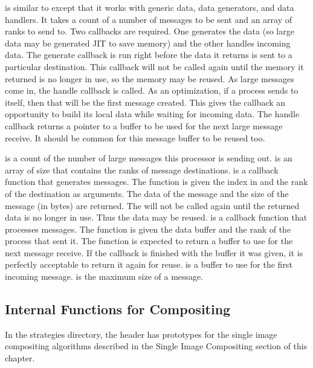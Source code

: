  is similar to
 except that it works with generic
data, data generators, and data handlers.  It takes a count of a number of
messages to be sent and an array of ranks to send to.  Two callbacks are
required.  One generates the data (so large data may be generated JIT to
save memory) and the other handles incoming data.  The generate callback is
run right before the data it returns is sent to a particular destination.
This callback will not be called again until the memory it returned is no
longer in use, so the memory may be reused.  As large messages come in, the
handle callback is called.  As an optimization, if a process sends to
itself, then that will be the first message created.  This gives the
callback an opportunity to build its local data while waiting for incoming
data.  The handle callback returns a pointer to a buffer to be used for the
next large message receive.  It should be common for this message buffer to
be reused too.

 is a count of the number of large messages this
processor is sending out.   is an array of size
 that contains the ranks of message destinations.
 is a callback function that generates messages.
The function is given the index in  and the rank
of the destination as arguments.  The data of the message and the size of
the message (in bytes) are returned.  The  will not
be called again until the returned data is no longer in use.  Thus the data
may be reused.   is a callback function that processes
messages.  The function is given the data buffer and the rank of the
process that sent it.  The function is expected to return a buffer to use
for the next message receive.  If the callback is finished with the buffer
it was given, it is perfectly acceptable to return it again for reuse.
 is a buffer to use for the first incoming message.
 is the maximum size of a message.

\subsection{Internal Functions for Compositing}

In the strategies directory, the  header
has prototypes for the single image compositing algorithms described in the
Single Image Compositing section of this chapter.

